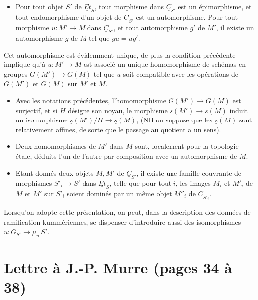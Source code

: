 \documentclass[11pt,a4paper]{article}
\begin{document}
\begin{itemize}
\item[b)] Pour tout objet $S'$ de $\underline{Et}_S$, tout morphisme dans
$\underline{C}_{S'}$ est un épimorphisme, et tout endomorphisme d'un objet de
$\underline{C}_{S'}$ est un automorphisme. Pour tout morphisme
$u : M' \to M$ dans $\underline{C}_{S'}$, et tout automorphisme $g'$ de $M'$,
il existe un automorphisme $g$ de $M$ tel que $gu = ug'$.
\end{itemize}

Cet automorphisme est évidemment unique, de plus la condition précédente
implique qu'à $u : M' \to M$ est associé un unique homomorphisme de schémas en
groupes $G(M') \to G(M)$ tel que $u$ soit compatible avec les opérations de
$G(M')$ et $G(M)$ sur $M'$ et $M$.

\begin{itemize}
\item[c)] Avec les notations précédentes,  l'homomorphisme
$G(M') \to G(M)$ est surjectif, et si $H$ désigne son noyau, le
\struck{\ill{}} morphisme $\underline{s}(M') \to \underline{s}(M)$ induit un
 isomorphisme $\underline{s}(M')/H \to \underline{s}(M)$,
  (NB on suppose que les $\underline{s}(M)$ sont  relativement affines, de sorte que le passage au quotient a un
sens).

\item[d)] Deux homomorphismes de $M'$ dans $M$ sont, localement pour la
topologie étale, déduits l'un de l'autre par composition avec un automorphisme
de $M$.
\end{itemize}

\begin{itemize}
\item[e)] Etant donnés deux objets $M, M'$ de $\underline{C}_{S'}$, il existe
une famille couvrante de morphismes $S'_i \to S'$ dans $\underline{Et}_S$,
telle que pour tout $i$, les images $M_i$ et $M'_i$ de $M$ et $M'$ sur $S'_i$
soient dominés par un même objet $M''_i$ de $\underline{C}_{S'_i}$.
\end{itemize}

Lorsqu'on adopte cette présentation, on peut, dans la description des données
de ramification kummériennes, se dispenser d'introduire aussi des isomorphismes
\struck{\ill{}} $u : G_{S'} \to \mu_{\underline{n}}\,S'$.

\section*{Lettre à J.-P. Murre (pages 34 à 38)}
\end{document}
